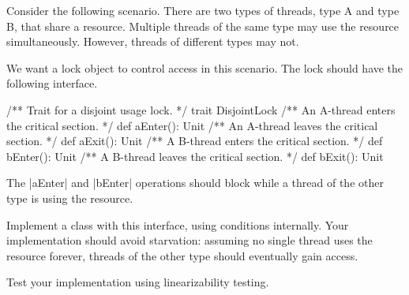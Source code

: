 \begin{questionS}
Consider the following scenario.  There are two types of threads, type A and
type B, that share a resource.  Multiple threads of the same type may use the
resource simultaneously.  However, threads of different types may not.

We want a lock object to control access in this scenario.  The lock should
have the following interface.
%
\begin{scala}
/** Trait for a disjoint usage lock. */
trait DisjointLock{
  /** An A-thread enters the critical section. */
  def aEnter(): Unit
  /** An A-thread leaves the critical section. */
  def aExit(): Unit
  /** A B-thread enters the critical section. */
  def bEnter(): Unit
  /** A B-thread leaves the critical section. */
  def bExit(): Unit
}
\end{scala}
%
The |aEnter| and |bEnter| operations should block while a thread of the other
type is using the resource.  

Implement a class with this interface, using conditions internally.  Your
implementation should avoid starvation: assuming no single thread uses the
resource forever, threads of the other type should eventually gain access. 

Test your implementation using linearizability testing. 
\end{questionS}


